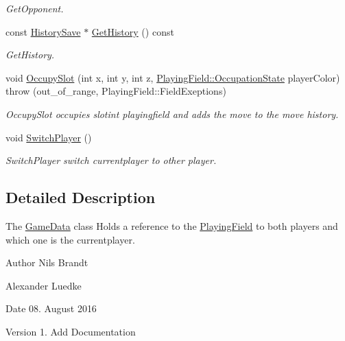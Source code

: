 \begin{DoxyCompactItemize}
\begin{DoxyCompactList}\small\item\em Get\-Opponent. \end{DoxyCompactList}\item 
const \hyperlink{classHistorySave}{History\-Save} $\ast$ \hyperlink{classGameData_ad0e34ba7f1106ff9b5fdd8e99f327ec1}{Get\-History} () const 
\begin{DoxyCompactList}\small\item\em Get\-History. \end{DoxyCompactList}\item 
void \hyperlink{classGameData_a5e1d9b00d89fea74a17e653057b47541}{Occupy\-Slot} (int x, int y, int z, \hyperlink{classPlayingField_ac6df152a3f820aa04a00ab4df4a9d265}{Playing\-Field\-::\-Occupation\-State} player\-Color)  throw (out\-\_\-of\-\_\-range, Playing\-Field\-::\-Field\-Exeptions)
\begin{DoxyCompactList}\small\item\em Occupy\-Slot occupies slotint playingfield and adds the move to the move history. \end{DoxyCompactList}\item 
\hypertarget{classGameData_a18924e62415d38e1651ef1ab7d488996}{void \hyperlink{classGameData_a18924e62415d38e1651ef1ab7d488996}{Switch\-Player} ()}\label{classGameData_a18924e62415d38e1651ef1ab7d488996}

\begin{DoxyCompactList}\small\item\em Switch\-Player switch currentplayer to other player. \end{DoxyCompactList}\end{DoxyCompactItemize}


\subsection{Detailed Description}
The \hyperlink{classGameData}{Game\-Data} class Holds a reference to the \hyperlink{classPlayingField}{Playing\-Field} to both players and which one is the currentplayer. 

\begin{DoxyAuthor}{Author}
Nils Brandt 

Alexander Luedke
\end{DoxyAuthor}
\begin{DoxyDate}{Date}
08. August 2016
\end{DoxyDate}
\begin{DoxyVersion}{Version}
1. Add Documentation 
\end{DoxyVersion}


